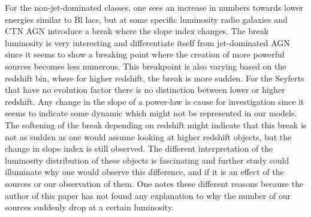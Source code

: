 


For the non-jet-dominated classes, one sees an increase in numbers towards lower energies similar to Bl lacs, but at some specific luminosity radio galaxies and CTN AGN introduce a break where the slope index changes. The break luminosity is very interesting and differentiate itself 
from jet-dominated AGN since it seems to show 
a breaking point where the creation of more powerful sources becomes less numerous. 
This breakpoint is also varying based on the redshift bin, where for higher redshift, the break is more sudden. For the Seyferts that have no evolution factor there is no distinction between lower or higher redshift.
Any change in the slope of a power-law is cause for investigation since it seems to indicate some dynamic which might not be represented in our models. The softening of the break depending on redshift 
might indicate that this break is not as sudden as one would assume looking at higher redshift objects, but the change in slope index is still observed. 
The different interpretation of the luminosity distribution of these objects is fascinating and further study could illuminate why one would observe this difference, and if it is an effect of the sources or our observation of them. One notes these different reasons because the author of this paper has not found any explanation to why the number of our sources suddenly drop at a certain luminosity. 




